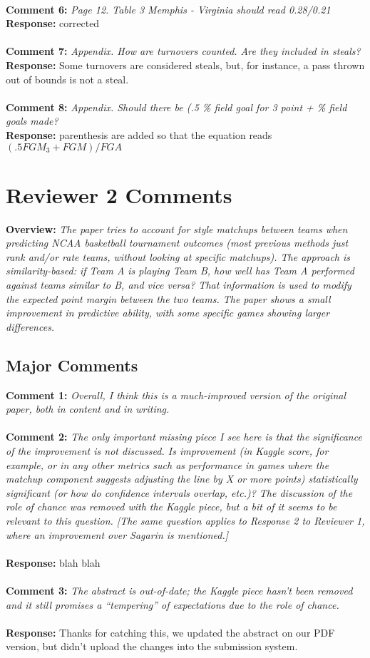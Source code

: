 \documentclass[11pt]{article} %
\begin{document}
\\
{\bf Comment 6:} \emph{Page 12. Table 3 Memphis - Virginia should read 0.28/0.21}\\
{\bf Response:} corrected\\
\\
{\bf Comment 7:} \emph{Appendix. How are turnovers counted. Are they included in steals? }\\
{\bf Response:} Some turnovers are considered steals, but, for instance, a pass thrown out of bounds is not a steal.\\
\\
{\bf Comment 8:} \emph{Appendix. Should there be (.5 \% field goal for 3 point + \% field goals made?}\\
{\bf Response:} parenthesis are added so that the equation reads $(.5 FGM_3 + FGM) /FGA$\\
 \newpage

\section*{Reviewer 2 Comments}
{\bf Overview:} \emph{The paper tries to account for style matchups between teams when predicting NCAA basketball tournament outcomes (most previous methods just rank and/or rate teams, without looking at specific matchups). The approach is similarity-based: if Team A is playing Team B, how well has Team A performed against teams similar to B, and vice versa? That information is used to modify the expected point margin between the two teams. The paper shows a small improvement in predictive ability, with some specific games showing larger differences.}
\subsection*{Major Comments}
{\bf Comment 1:} \emph{Overall, I think this is a much-improved version of the original paper, both in content and in writing.}\\
\\
{\bf Comment 2:} \emph{The only important missing piece I see here is that the significance of the improvement is not discussed. Is improvement (in Kaggle score, for example, or in any other metrics such as performance in games where the matchup component suggests adjusting the line by X or more points) statistically significant (or how do confidence intervals overlap, etc.)? The discussion of the role of chance was removed with the Kaggle piece, but a bit of it seems to be relevant to this question. [The same question applies to Response 2 to Reviewer 1, where an improvement over Sagarin is mentioned.]} \\
\\
{\bf Response:} blah blah\\
\\
{\bf Comment 3:} \emph{The abstract is out-of-date; the Kaggle piece hasn't been removed and it still promises a ``tempering'' of expectations due to the role of chance.}\\
\\
{\bf Response:} Thanks for catching this, we updated the abstract on our PDF version, but didn't upload the changes into the submission system.
\end{document}
